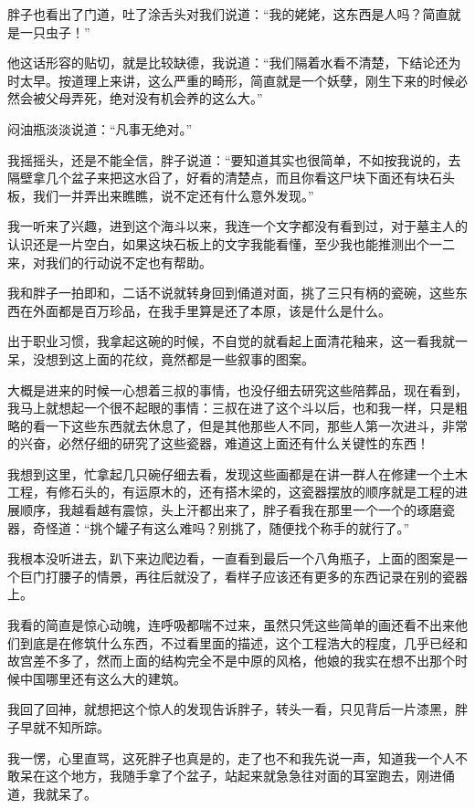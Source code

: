 胖子也看出了门道，吐了涂舌头对我们说道：“我的姥姥，这东西是人吗？简直就是一只虫子！”

他这话形容的贴切，就是比较缺德，我说道：“我们隔着水看不清楚，下结论还为时太早。按道理上来讲，这么严重的畸形，简直就是一个妖孽，刚生下来的时候必然会被父母弄死，绝对没有机会养的这么大。”

闷油瓶淡淡说道：“凡事无绝对。”

我摇摇头，还是不能全信，胖子说道：“要知道其实也很简单，不如按我说的，去隔壁拿几个盆子来把这水舀了，好看的清楚点，而且你看这尸块下面还有块石头板，我们一并弄出来瞧瞧，说不定还有什么意外发现。”

我一听来了兴趣，进到这个海斗以来，我连一个文字都没有看到过，对于墓主人的认识还是一片空白，如果这块石板上的文字我能看懂，至少我也能推测出个一二来，对我们的行动说不定也有帮助。

我和胖子一拍即和，二话不说就转身回到俑道对面，挑了三只有柄的瓷碗，这些东西在外面都是百万珍品，在我手里算是还了本原，该是什么是什么。

出于职业习惯，我拿起这碗的时候，不自觉的就看起上面清花釉来，这一看我就一呆，没想到这上面的花纹，竟然都是一些叙事的图案。

大概是进来的时候一心想着三叔的事情，也没仔细去研究这些陪葬品，现在看到，我马上就想起一个很不起眼的事情：三叔在进了这个斗以后，也和我一样，只是粗略的看一下这些东西就去休息了，但是其他那些人不同，那些人第一次进斗，非常的兴奋，必然仔细的研究了这些瓷器，难道这上面还有什么关键性的东西！

我想到这里，忙拿起几只碗仔细去看，发现这些画都是在讲一群人在修建一个土木工程，有修石头的，有运原木的，还有搭木梁的，这瓷器摆放的顺序就是工程的进展顺序，我越看越有震惊，头上汗都出来了，胖子看我在那里一个一个的琢磨瓷器，奇怪道：“挑个罐子有这么难吗？别挑了，随便找个称手的就行了。”

我根本没听进去，趴下来边爬边看，一直看到最后一个八角瓶子，上面的图案是一个巨门打腰子的情景，再往后就没了，看样子应该还有更多的东西记录在别的瓷器上。

我看的简直是惊心动魄，连呼吸都喘不过来，虽然只凭这些简单的画还看不出来他们到底是在修筑什么东西，不过看里面的描述，这个工程浩大的程度，几乎已经和故宫差不多了，然而上面的结构完全不是中原的风格，他娘的我实在想不出那个时候中国哪里还有这么大的建筑。

我回了回神，就想把这个惊人的发现告诉胖子，转头一看，只见背后一片漆黑，胖子早就不知所踪。

我一愣，心里直骂，这死胖子也真是的，走了也不和我先说一声，知道我一个人不敢呆在这个地方，我随手拿了个盆子，站起来就急急往对面的耳室跑去，刚进俑道，我就呆了。


